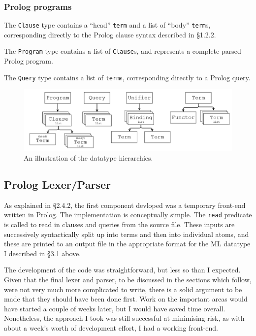 \documentclass[12pt]{article}
\begin{document}
\subsubsection{Prolog programs}

The \verb|Clause| type contains a ``head'' \verb|term| and a list of ``body'' \verb|term|s, corresponding directly to the Prolog clause syntax described in \S1.2.2.

The \verb|Program| type contains a list of \verb|Clause|s, and represents a complete parsed Prolog program.

The \verb|Query| type contains a list of \verb|term|s, corresponding directly to a Prolog query.


\begin{figure}[H]
\includegraphics[scale=0.33]{Datatypes.png}
\caption{An illustration of the datatype hierarchies.}
\end{figure}

\subsection{Prolog Lexer/Parser}

As explained in \S2.4.2, the first component devloped was a temporary front-end written in Prolog.
The implementation is conceptually simple. 
The \verb|read| predicate is called to read in clauses and queries from the source file. 
These inputs are successively syntactically split up into terms and then into individual atoms, and these are printed to an output file in the appropriate format for the ML datatype I described in \S3.1 above.

The development of the code was straightforward, but less so than I expected. 
Given that the final lexer and parser, to be discussed in the sections which follow, were not very much more complicated to write, there is a solid argument to be made that they should have been done first.
Work on the important areas would have started a couple of weeks later, but I would have saved time overall.
Nonetheless, the approach I took was still successful at minimising risk, as with about a week's worth of development effort, I had a working front-end.
\end{document}
